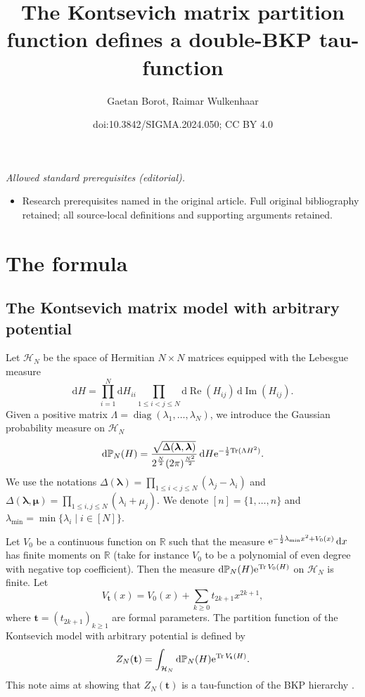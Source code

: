 \documentclass[10pt,a4paper]{amsart}
\title{The Kontsevich matrix partition function defines a double-BKP tau-function}
\author{Gaetan Borot, Raimar Wulkenhaar}
\date{doi:10.3842/SIGMA.2024.050; CC BY 4.0}
\numberwithin{equation}{section}
\newcommand{\dd}{\mathrm{d}}
\begin{document}
\maketitle
\noindent\textit{Allowed standard prerequisites (editorial).}\begin{itemize}
\item Research prerequisites named in the original article. Full original bibliography retained; all source-local definitions and supporting arguments retained.
\end{itemize}\medskip
\section{The formula}\label{Chap1}

\subsection{The Kontsevich matrix model with arbitrary potential}

Let $\mathcal{H}_N$ be the space of Hermitian $N \times N$ matrices
equipped with the Lebesgue measure
\[
\dd H= \prod_{i=1}^N \dd H_{ii}
 \prod_{1 \leq i < j \leq N} \dd\operatorname{Re}(H_{ij})\, \dd\operatorname{Im}(H_{ij}).
\]
Given a positive matrix $\Lambda = \operatorname{diag}(\lambda_1,\dots,\lambda_N)$,
we introduce the Gaussian probability measure on $\mathcal{H}_N$
\begin{equation}
\label{theGauss}
\dd \mathbb{P}_N(H) = \frac{\sqrt{\Delta(\boldsymbol{\lambda},\boldsymbol{\lambda})}}{2^{\frac{N}{2}} (2\pi)^{\frac{N^2}{2}}}\,\dd H {\rm e}^{-\frac{1}{2}{\rm Tr}(\Lambda H^2)}.
\end{equation}
We use the notations $\Delta(\boldsymbol{\lambda}) = \prod_{1 \leq i < j \leq N} (\lambda_j - \lambda_i)$ and $\Delta(\boldsymbol{\lambda},\boldsymbol{\mu}) = \prod_{1 \leq i,j \leq N} (\lambda_i + \mu_j)$. We denote $[n] = \{1,\dots,n\}$ and $\lambda_{\min} = \min\{\lambda_i\mid i \in [N]\}$.

Let $V_0$ be a continuous function on $\mathbb{R}$ such that the measure ${\rm e}^{- \frac{1}{2}\lambda_{\min} x^2 + V_0(x)}\,\dd x$ has finite moments on $\mathbb{R}$ (take for instance $V_0$ to be a polynomial of even degree with negative top coefficient). Then the measure $\dd \mathbb{P}_N(H) {\rm e}^{ \operatorname{Tr}V_0(H)}$ on $\mathcal{H}_N$ is finite. Let
\[
V_{\mathbf{t}}(x) = V_0(x) + \sum_{k \geq 0} t_{2k + 1} x^{2k + 1},
\]
where $\mathbf{t} = (t_{2k + 1})_{k \geq 1}$ are formal parameters. The partition function of the Kontsevich model with arbitrary potential is defined by
\begin{equation}
\label{Zdef} Z_N(\mathbf{t}) = \int_{\mathcal{H}_N} \dd\mathbb{P}_N(H) {\rm e}^{\operatorname{Tr}V_{\mathbf{t}}(H)}.
\end{equation}
This note aims at showing that $Z_N(\mathbf{t})$ is a
tau-function of the BKP hierarchy \cite{Date:1981qz}.
\end{document}

